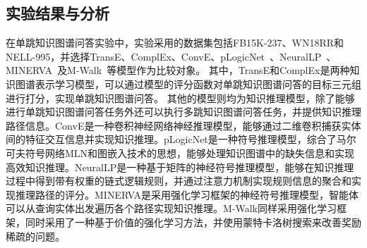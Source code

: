 \documentclass[algorithmlist, AutoFakeBold, AutoFakeSlant, figurelist, tablelist, nomlist, engineering]{seuthesix}
\begin{document}
\subsection{实验结果与分析}
在单跳知识图谱问答实验中，实验采用的数据集包括FB15K-237、WN18RR和NELL-995，并选择TransE、ComplEx、ConvE、pLogicNet~\cite{qu2019probabilistic}、NeuralLP~\cite{yang2017differentiable}、MINERVA~\cite{das2018go}及M-Walk~\cite{shen2018m}等模型作为比较对象。
其中，TransE和ComplEx是两种知识图谱表示学习模型，可以通过模型的评分函数对单跳知识图谱问答的目标三元组进行打分，实现单跳知识图谱问答。
其他的模型则均为知识推理模型，除了能够进行单跳知识图谱问答任务外还可以执行多跳知识图谱问答任务，并提供知识推理路径信息。ConvE是一种卷积神经网络神经推理模型，能够通过二维卷积捕获实体间的特征交互信息并实现知识推理。pLogicNet是一种符号推理模型，综合了马尔可夫符号网络MLN和图嵌入技术的思想，能够处理知识图谱中的缺失信息和实现高效知识推理。NeuralLP是一种基于矩阵的神经符号推理模型，能够在知识推理过程中得到带有权重的链式逻辑规则，并通过注意力机制实现规则信息的聚合和实现推理路径的评分。MINERVA是采用强化学习框架的神经符号推理模型，智能体可以从查询实体出发遍历各个路径实现知识推理。M-Walk同样采用强化学习框架，同时采用了一种基于价值的强化学习方法，并使用蒙特卡洛树搜索来改善奖励稀疏的问题。
\end{document}
